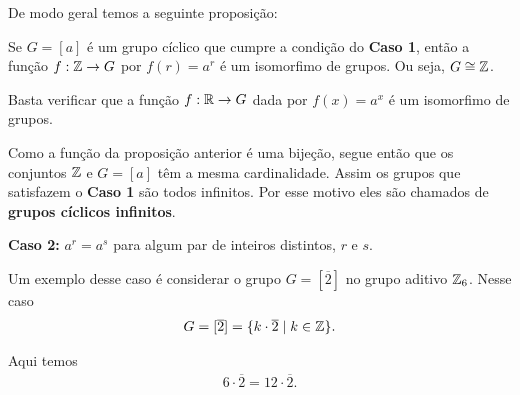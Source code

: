 De modo geral temos a seguinte proposição:

\begin{proposicao}
    Se $G = [a]$ é um grupo cíclico que cumpre a condição do \textbf{Caso 1}, então a função $f : \mathbb{Z} \to G$ por $f(r) = a^r$ é um isomorfimo de grupos. Ou seja, $G \cong \mathbb{Z}$.
\end{proposicao}
\begin{prova}
    Basta verificar que a função $f : \mathbb{R} \to G$ dada por $f(x) = a^x$ é um isomorfimo de grupos.
\end{prova}

\begin{observacao}
    Como a função da proposição anterior é uma bijeção, segue então que os conjuntos $\mathbb{Z}$ e $G = [a]$ têm a mesma cardinalidade. Assim os grupos que satisfazem o \textbf{Caso 1} são todos infinitos. Por esse motivo eles são chamados de \textbf{grupos cíclicos infinitos}.
\end{observacao}

\textbf{Caso 2:} $a^r = a^s$ para algum par de inteiros distintos, $r$ e $s$.

Um exemplo desse caso é considerar o grupo $G = [\overline{2}]$ no grupo aditivo $\mathbb{Z}_6$. Nesse caso
\begin{align*}
    G = [\overline{2}] = \{k \cdot \overline{2} \mid k \in \mathbb{Z}\}.
\end{align*}

Aqui temos
\begin{align*}
    6\cdot\overline{2} = 12\cdot \overline{2}.
\end{align*}

